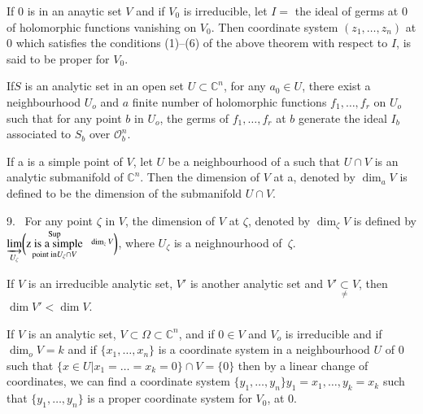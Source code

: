 If $0$ is in an anaytic set $V$ and if $V_{0}$ is irreducible, let $I
=$ the ideal of germs at $0$ of holomorphic functions vanishing on
$V_{0}$. Then coordinate system $(z_{1},\ldots,z_{n})$ at $0$ which
satisfies the conditions (1)--(6) of the above theorem with respect
to $I$, is said to be proper for $V_{0}$. 

\begin{theorem}[H. Cartan]\label{chap1-thm6} 
  If\pageoriginale $S$ is an analytic set in an open set $U \subset
  \mathbb{C}^{n}$, 
  for any $a_0 \in U$, there exist a neighbourhood $U_{o}$ and
  $a$ finite number of holomorphic functions $f_{1},\ldots,f_{r}$ on
  $U_{o}$ such that for any point $b$ in $U_{o}$, the germs of
  $f_{1},\ldots,f_{r}$ at $b$ generate the ideal $I_{b}$ associated to
  $S_{b}$  over  $ \mathscr{O}^{n}_{b}$.   
\end{theorem}

\setcounter{definitions}{7}
\begin{definitions}\label{chap1-defins8} 
  If a is a simple point of $V$, let $U$ be a neighbourhood of a such
  that $U \cap V$ is an analytic submanifold of $\mathbb{C}^{n}$. Then
  the dimension of $V$ at a, denoted by $\dim_{a} V$ is defined to be
  the dimension of the submanifold $U \cap V$. 
\end{definitions}

9.~ For any point $\zeta$ in $V$, the dimension of $V$ at $\zeta$,
denoted by $\dim _{\zeta} V$ is defined by $ 
\underset{U_{\zeta}}{\varinjlim} \bigg( \underset{\text{point in}
  U_{\zeta} \cap V} {\overset {\text{Sup}}{\text{z is a simple}}} ~~~
\overset{\dim_z V}{\empty}  \bigg)$, where $U_{\zeta}$ is a
neighnourhood of~$\zeta$. 

\begin{proposition}\label{chap1-prop2} %
  If $V$ is an irreducible analytic set, $V'$ is another analytic set
  and $V' \underset{\neq}{\subset} V$, then $\dim V' < \dim V$. 
\end{proposition}   

\begin{proposition}\label{chap1-prop3}  %
  If $V$ is an analytic set, $V \subset \Omega \subset
  \mathbb{C}^{n}$, and if $0 \in V$ and $V_{o}$ is irreducible and if
  $\dim_{o} V =k$ and if $\{x_{1},\ldots,x_{n} \}$  is a coordinate
  system in a neighbourhood $U$ of $0$ such that $\{x\in U|  x_{1} =
  \ldots = x_{k} = 0 \} \cap V = \{0\}$ then by a linear change of
  coordinates, we can find a coordinate system $\{y_{1},\ldots,
  y_{n}\} y_{1} = x_{1}, \ldots ,y_{k} = x_{k}$ such that
  $\{y_{1},\ldots, y_{n}\}$ is a proper coordinate system for $V_{0}$,
  at $0$.   
\end{proposition}
 

